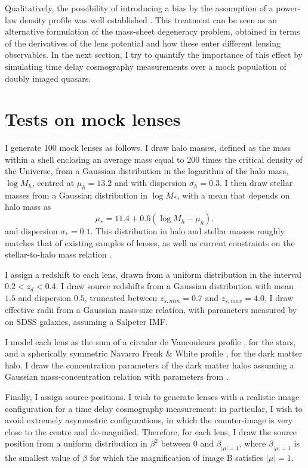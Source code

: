 \documentclass[usenatbib]{mnras}
\def\betamu{\beta_{|\mu|=1}}
\begin{document}
Qualitatively, the possibility of introducing a bias by the assumption of a power-law density profile was well established \citep{S+S13}.
This treatment can be seen as an alternative formulation of the mass-sheet degeneracy problem, obtained in terms of the derivatives of the lens potential and how these enter different lensing observables.
In the next section, I try to quantify the importance of this effect by simulating time delay cosmography measurements over a mock population of doubly imaged quasars.

\section{Tests on mock lenses}\label{sect:mock}

I generate 100 mock lenses as follows. I draw halo masses, defined as the mass within a shell enclosing an average mass equal to 200 times the critical density of the Universe, from a Gaussian distribution in the logarithm of the halo mass, $\log{M_h}$, centred at $\mu_h=13.2$ and with dispersion $\sigma_h=0.3$. I then draw stellar masses from a Gaussian distribution in $\log{M_*}$, with a mean that depends on halo mass as
\begin{equation}
\mu_* = 11.4 + 0.6(\log{M_h} - \mu_h),
\end{equation}
and dispersion $\sigma_*=0.1$.
This distribution in halo and stellar masses roughly matches that of existing samples of lenses, as well as current constraints on the stellar-to-halo mass relation \citep{Gav++07, Aug++10, Beh++13}.

I assign a redshift to each lens, drawn from a uniform distribution in the interval $0.2 < z_d < 0.4$. I draw source redshifts from a Gaussian distribution with mean $1.5$ and dispersion $0.5$, truncated between $z_{s,min}=0.7$ and $z_{s,max}=4.0$.
I draw effective radii from a Gaussian mass-size relation, with parameters measured by \citet{New++12} on SDSS galaxies, assuming a Salpeter IMF.

I model each lens as the sum of a circular de Vaucouleurs profile \citep{deV48}, for the stars, and a spherically symmetric Navarro Frenk \& White profile \citep[NFW][]{NFW97}, for the dark matter halo.
I draw the concentration parameters of the dark matter halos assuming a Gaussian mass-concentration relation with parameters from \citet{Mac++08}.

Finally, I assign source positions.
I wish to generate lenses with a realistic image configuration for a time delay cosmography measurement: in particular, I wish to avoid extremely asymmetric configurations, in which the counter-image is very close to the centre and de-magnified.
Therefore, for each lens, I draw the source position from a uniform distribution in $\beta^2$ between 0 and $\betamu$, where $\betamu$ is the smallest value of $\beta$ for which the magnification of image B satisfies $|\mu|=1$. 
\end{document}
